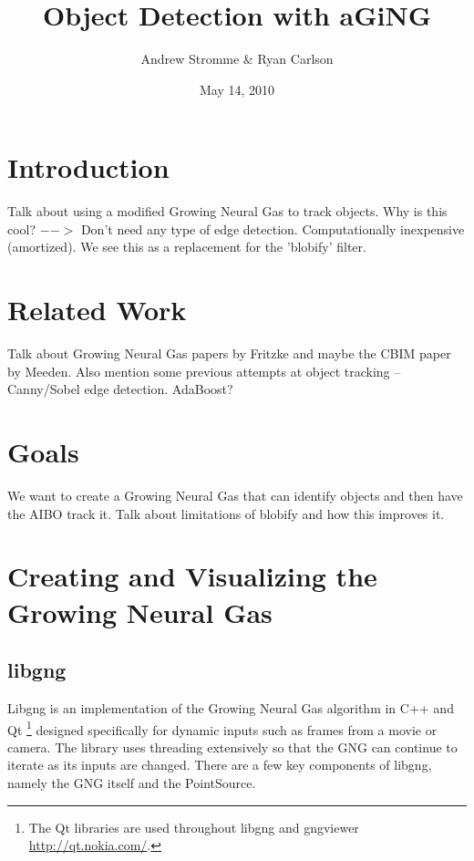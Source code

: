 \documentclass{article}
\renewcommand{\|}{\origbar} %
\begin{document}
\title{Object Detection with aGiNG}
\author{Andrew Stromme \& Ryan Carlson}
\date{May 14, 2010}
\maketitle

\begin{abstract}
\end{abstract}

\section{Introduction}

Talk about using a modified Growing Neural Gas to track objects. Why is this cool? $-->$ Don't need any type of edge detection. Computationally inexpensive (amortized). We see this as a replacement for the 'blobify' filter.

\section{Related Work}

Talk about Growing Neural Gas papers by Fritzke and maybe the CBIM paper by Meeden. Also mention some previous attempts at object tracking -- Canny/Sobel edge detection. AdaBoost?

\section{Goals}

We want to create a Growing Neural Gas that can identify objects and then have the AIBO track it. Talk about limitations of blobify and how this improves it.

\section{Creating and Visualizing the Growing Neural Gas}

\subsection{libgng}

Libgng is an implementation of the Growing Neural Gas algorithm in C++ and Qt \footnote{The Qt libraries are used throughout libgng and gngviewer \url{http://qt.nokia.com/}.} designed specifically for dynamic inputs such as frames from a movie or camera. The library uses threading extensively so that the GNG can continue to iterate as its inputs are changed. There are a few key components of libgng, namely the GNG itself and the PointSource.
\end{document}
